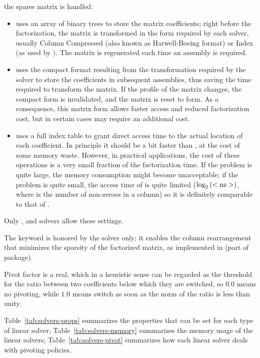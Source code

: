 the sparse matrix is handled:
\begin{itemize}
\item {} uses an array of binary trees to store the matrix
coefficients; right before the factorization, the matrix is transformed
in the form required by each solver, usually Column Compressed
(also known as Harwell-Boeing format) or Index (as used by ).
The matrix is regenerated each time an assembly is required.
\item {} uses the compact format resulting from the transformation
required by the solver to store the coefficients in subsequent assemblies,
thus saving the time required to transform the matrix.
If the profile of the matrix changes, the compact form is invalidated,
and the matrix is reset to  form.  As a consequence, this matrix
form allows faster access and reduced factorization cost, but in certain
cases may require an additional cost.
\item {} uses a full index table to grant direct access time to
the actual location of each coefficient.
In principle it should be a bit faster than , at the cost
of some memory waste.
However, in practical applications, the cost of these operations
is a very small fraction of the factorization time.
If the problem is quite large, the memory consumption might
become unacceptable; if the problem is quite small, the access time
of  is quite limited ($\log_2\left( \mathrm{<nz>} \right)$, where
 is the number of non-zeroes in a column) so it is definitely
comparable to that of .
\end{itemize}
Only ,  and  solvers allow these
settings.

\noindent
The keyword  is honored by the  solver only;
it enables the column rearrangement that minimizes the sparsity
of the factorized matrix, as implemented in 
(part of  package).

\noindent
Pivot factor is a real, which in a heuristic sense can be regarded as
the threshold for the ratio between two coefficients below which they are
switched, so $ 0.0 $ means no pivoting, while $ 1.0 $ means switch as
soon as the norm of the ratio is less than unity.

\noindent
Table~\ref{tab:solvers-props} summarizes the properties that can be set
for each type of linear solver; Table~\ref{tab:solvers-memory} summarizes 
the memory usage of the linear solvers; Table~\ref{tab:solvers-pivot}
summarizes how each linear solver deals with pivoting policies.

